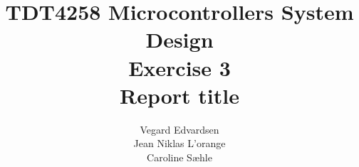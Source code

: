 \documentclass[a4paper,10pt]{article}
\title{TDT4258 Microcontrollers System Design\\Exercise 3\\[20pt]
Report title}
\author{Vegard Edvardsen\\Jean Niklas L'orange\\Caroline Sæhle}
\begin{document}
\maketitle

\begin{abstract}

\end{abstract}

\newpage
\tableofcontents
\newpage







\end{document}

